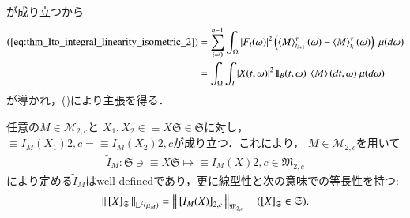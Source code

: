 \begin{prf}
\begin{description}
				が成り立つから
				\begin{align}
					\mbox{(\refeq{eq:thm_Ito_integral_linearity_isometric_2})}
					&= \sum_{i=0}^{n-1} \int_\Omega |F_i(\omega)|^2 \left( \inprod<M>^\tau_{t_{i+1}}(\omega) - \inprod<M>^\tau_{t_i}(\omega) \right)\ \mu(d\omega) \\
					&= \int_\Omega \int_I |X(t,\omega)|^2 \defunc_B(t,\omega)\ \inprod<M>(dt,\omega)\ \mu(d\omega)
				\end{align}
				が導かれ，()により主張を得る．
				\QED
		\end{description}
	\end{prf}
	
	\begin{screen}
		\begin{thm}[同値類に対する伊藤積分]
			任意の$M \in \mathcal{M}_{2,c}$と
			$X_1,X_2 \in \equiv{X}{\mathfrak{S}} \in \mathfrak{S}$に対し，
			$\equiv{I_M(X_1)}{2,c} = \equiv{I_M(X_2)}{2,c}$が成り立つ．これにより，
			$M \in \mathcal{M}_{2,c}$を用いて
			\begin{align}
				\tilde{I}_M:\mathfrak{S} \ni \equiv{X}{\mathfrak{S}} \longmapsto \equiv{I_M(X)}{2,c} \in \mathfrak{M}_{2,c}
			\end{align}
			により定める$\tilde{I}_M$はwell-definedであり，更に線型性と次の意味での等長性を持つ:
			\begin{align}
				\left\|\, \left[X\right]_{\mathfrak{S}}\, \right\|_{\operatorname{L}^{2} \left(\mu_M\right)} = \left\|\, \left[I_M(X)\right]_{2,c}\, \right\|_{\mathfrak{M}_{2,c}}
				\quad (\left[X\right]_{\mathfrak{S}} \in \mathfrak{S}).
				\label{eq:thm_Ito_integral_equiv_class_linearity_isometric}
			\end{align}
			\label{thm:Ito_integral_equiv_class_linearity_isometric}
		\end{thm}
	\end{screen}
	
